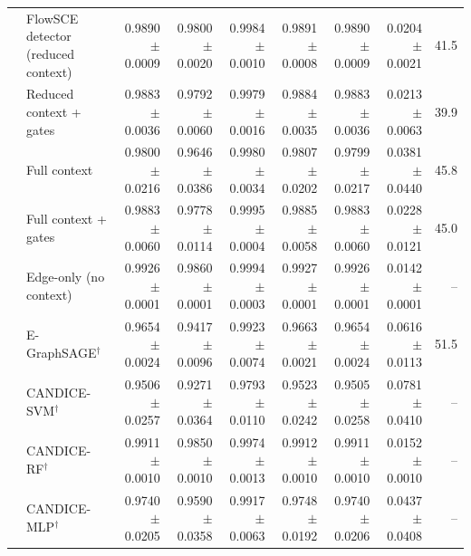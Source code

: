 \begin{table}[t]
\begin{tabular}{@{}llrrrrrrr@{}}
 & FlowSCE detector (reduced context) & 0.9890 $\pm$ 0.0009 & 0.9800 $\pm$ 0.0020 & 0.9984 $\pm$ 0.0010 & 0.9891 $\pm$ 0.0008 & 0.9890 $\pm$ 0.0009 & 0.0204 $\pm$ 0.0021 & 41.5 \\
 & Reduced context + gates & 0.9883 $\pm$ 0.0036 & 0.9792 $\pm$ 0.0060 & 0.9979 $\pm$ 0.0016 & 0.9884 $\pm$ 0.0035 & 0.9883 $\pm$ 0.0036 & 0.0213 $\pm$ 0.0063 & 39.9 \\
 & Full context & 0.9800 $\pm$ 0.0216 & 0.9646 $\pm$ 0.0386 & 0.9980 $\pm$ 0.0034 & 0.9807 $\pm$ 0.0202 & 0.9799 $\pm$ 0.0217 & 0.0381 $\pm$ 0.0440 & 45.8 \\
 & Full context + gates & 0.9883 $\pm$ 0.0060 & 0.9778 $\pm$ 0.0114 & 0.9995 $\pm$ 0.0004 & 0.9885 $\pm$ 0.0058 & 0.9883 $\pm$ 0.0060 & 0.0228 $\pm$ 0.0121 & 45.0 \\
 & Edge-only (no context) & 0.9926 $\pm$ 0.0001 & 0.9860 $\pm$ 0.0001 & 0.9994 $\pm$ 0.0003 & 0.9927 $\pm$ 0.0001 & 0.9926 $\pm$ 0.0001 & 0.0142 $\pm$ 0.0001 & -- \\
 & E-GraphSAGE$^\dagger$ & 0.9654 $\pm$ 0.0024 & 0.9417 $\pm$ 0.0096 & 0.9923 $\pm$ 0.0074 & 0.9663 $\pm$ 0.0021 & 0.9654 $\pm$ 0.0024 & 0.0616 $\pm$ 0.0113 & 51.5 \\
 & CANDICE-SVM$^\dagger$ & 0.9506 $\pm$ 0.0257 & 0.9271 $\pm$ 0.0364 & 0.9793 $\pm$ 0.0110 & 0.9523 $\pm$ 0.0242 & 0.9505 $\pm$ 0.0258 & 0.0781 $\pm$ 0.0410 & -- \\
 & CANDICE-RF$^\dagger$ & 0.9911 $\pm$ 0.0010 & 0.9850 $\pm$ 0.0010 & 0.9974 $\pm$ 0.0013 & 0.9912 $\pm$ 0.0010 & 0.9911 $\pm$ 0.0010 & 0.0152 $\pm$ 0.0010 & -- \\
 & CANDICE-MLP$^\dagger$ & 0.9740 $\pm$ 0.0205 & 0.9590 $\pm$ 0.0358 & 0.9917 $\pm$ 0.0063 & 0.9748 $\pm$ 0.0192 & 0.9740 $\pm$ 0.0206 & 0.0437 $\pm$ 0.0408 & -- \\
\bottomrule
\end{tabular}
\end{table}
